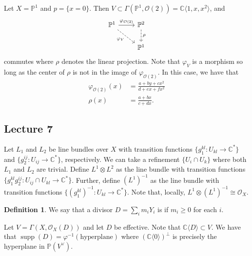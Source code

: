 \documentclass[10pt,letterpaper,cm]{nupset}
\theoremstyle{definition}
\newtheorem{defn}{Definition}[subsection]
\theoremstyle{theorem}
\theoremstyle{remark}
\newcommand{\C}{\mathbb C}
\renewcommand{\O}{\mathcal O}
\renewcommand{\P}{\mathbb P}
\newcommand{\1}{\mathbb{1}}
\newcommand{\0}{\vec 0}
\DeclareMathOperator{\supp}{supp}
\begin{document}
Let $X = \P^1$ and $p = \{x=0\}$. Then $V \subset \Gamma\left(\P^1, \O(2)\right) = \C\langle 1, x, x^2\rangle$, and
\[
\begin{tikzcd}
\P^1 \arrow[rd, "\varphi_V"', dashed] \arrow[r, "\varphi_{\O(2)}"] & \P^2 \arrow[d, "\rho", dashed] \\
                                                                   & \P^1                       
\end{tikzcd}
\] commutes where $\rho$ denotes the linear projection. Note that $\varphi_V$ is a morphism so long as the center of $\rho$ is not in the image of $\varphi_{\O(2)}$. In this case, we have that
\begin{align*}
\varphi_{\O(2)}(x) & = \frac{a +by + cx^2}{d + ex +fx^2}
\\  \rho(x) & = \frac{a+bx}{c+dx}.
\end{align*}

\subsection{Lecture 7}

Let $L_1$ and $L_2 $ be line bundles over $X$ with transition functions $\{g_1^{k{l}} : U_{k{l}} \to \C^{\ast}\}$ and $\{g_2^{i{j}} : U_{i{j}} \to \C^{\ast}\}$, respectively. We can take a refinement $\{U_{i} \cap U_k\}$ where both $L_1$ and $L_2$ are trivial.  Define $L^1 \otimes L^2$ as the line bundle with transition functions $\{g_1^{k{l}}g_2^{i{j}} : U_{ij} \cap U_{k{l}} \to \C^{\ast}\}$. Further, define $\left(L^1\right)^{-1}$ as the line bundle with transition functions $\{\left(g_1^{k{l}}\right)^{-1} : U_{k{l}} \to \C^{\ast}\}$. Note that, locally, $L^1 \otimes \left(L^1\right)^{-1} \cong \O_X$.

\begin{defn}
We say that a divisor $D = \sum_im_iY_i$ is  if $m_i\geq 0$ for each $i$.
\end{defn}

Let $V = \Gamma\left(X, \O_X(D)\right)$ and let $D$ be effective. Note that $\C\langle D \rangle \subset V$. We have that $\supp(D) = \varphi^{-1}\left(\text{hyperplane}\right)$ where $\left(\C \langle 0\rangle \right)^{\perp}$ is precisely the hyperplane in $\P\left(V^{\vee}\right)$.
\end{document}
